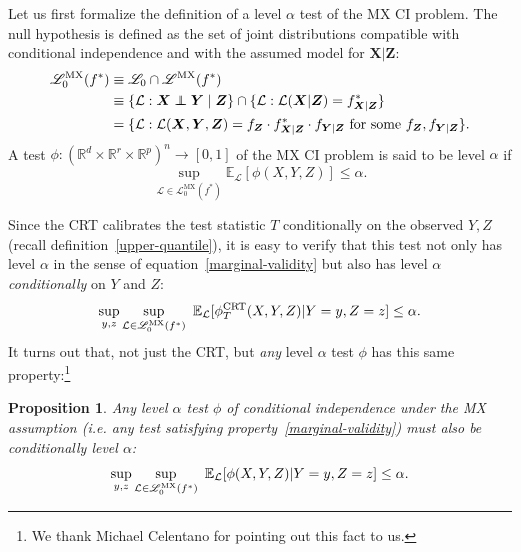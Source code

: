 \documentclass[12pt]{article}
\newtheorem{proposition}{Proposition}
\theoremstyle{definition}
\theoremstyle{remark}
\def\independenT#1#2{\mathrel{\rlap{$#1#2$}\mkern2mu{#1#2}}}
\newcommand\independent{\protect\mathpalette{\protect\independenT}{\perp}}
\newcommand{\prx}{\bm X}
\newcommand{\srx}{X}
\newcommand{\prz}{\bm Z}
\newcommand{\srz}{Z}
\newcommand{\sfz}{z}
\newcommand{\pry}{{\bm Y}}
\newcommand{\sry}{Y}
\newcommand{\sfy}{y}
\begin{document}
Let us first formalize the definition of a level $\alpha$ test of the MX CI problem. The null hypothesis is defined as the set of joint distributions compatible with conditional independence and with the assumed model for $\prx|\prz$:
\begin{equation}
	\label{eq:null-under-modelX}
	\begin{split}
		\mathscr L^{\text{MX}}_0(f^*) &\equiv \mathscr L_0 \cap \mathscr L^{\text{MX}}(f^*) \\
		&\equiv \{\mathcal L: \prx \independent \pry \mid \prz\} \cap \{\mathcal L: \mathcal L(\prx|\prz) = f^*_{\prx|\prz}\}\\
		&= \{\mathcal L: \mathcal L(\prx,\pry,\prz) = f_{\prz} \cdot f^*_{\prx|\prz} \cdot f_{\pry|\prz} \text{ for some } f_{\prz}, f_{\pry|\prz} \}.
	\end{split}
\end{equation}
A test $\phi: (\mathbb R^{d} \times \mathbb R^r \times \mathbb R^p)^n \rightarrow [0,1]$ of the MX CI problem is said to be level $\alpha$ if
\begin{equation}
	\sup_{\mathcal L \in \mathscr L^{\text{MX}}_0(f^*)} \mathbb E_{\mathcal L}[\phi(\srx, \sry, \srz)] \leq \alpha.
	\label{marginal-validity}
\end{equation}

Since the CRT calibrates the test statistic $T$ conditionally on the observed $\sry, \srz$ (recall definition~\eqref{upper-quantile}), it is easy to verify that this test not only has level $\alpha$ in the sense of equation~\eqref{marginal-validity} but also has level $\alpha$ \textit{conditionally} on $\sry$ and $\srz$:
\begin{equation}
	\sup_{y,z} \sup_{\mathcal L \in \mathscr L_0^{\textnormal{MX}}(f^*)}\ \mathbb E_{\mathcal L}[\phi^{\textnormal{CRT}}_T(\srx, \sry, \srz)|\sry = \sfy, \srz = \sfz] \leq \alpha.
\label{eq:conditional-validity}
\end{equation}
It turns out that, not just the CRT, but \emph{any} level $\alpha$ test $\phi$ has this same property:\footnote{We thank Michael Celentano for pointing out this fact to us.}
\begin{proposition} \label{prop:marginal-implies-conditional}
	Any level $\alpha$ test $\phi$ of conditional independence under the MX assumption (i.e. any test satisfying property~\eqref{marginal-validity}) must also be conditionally level $\alpha$:
	\begin{equation}
		\sup_{y,z} \sup_{\mathcal L \in \mathscr L_0^{\textnormal{MX}}(f^*)}\ \mathbb E_{\mathcal L}[\phi(\srx, \sry, \srz)|\sry = \sfy, \srz = \sfz] \leq \alpha.
	\end{equation}
\end{proposition}
\end{document}
